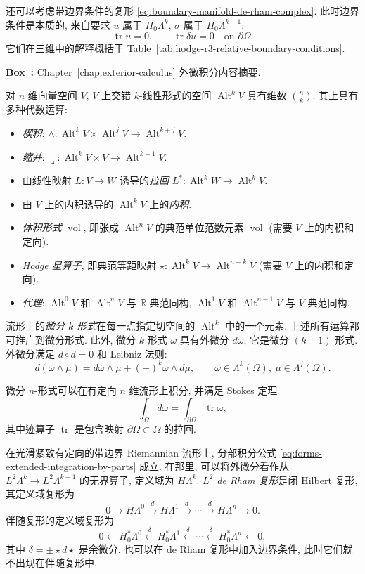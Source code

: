还可以考虑带边界条件的复形 \eqref{eq:boundary-manifold-de-rham-complex}. 此时边界条件是本质的, 来自要求 $u$ 属于 $ H_{0}\Lambda^k$, $\sigma$ 属于 $ H_{0}\Lambda^{k-1}$:
\[
\operatorname{tr}u=0,\qquad\operatorname{tr}\delta u=0\quad\text{on }\partial\Omega.
\]
它们在三维中的解释概括于 Table~\ref{tab:hodge-r3-relative-boundary-conditions}.
\newpage
\begin{MBSourceBox}
\label{box:exterior-calculus-summary}
\noindent\textbf{Box~\thebooksummary:} {Chapter~\ref{chap:exterior-calculus} 外微积分内容摘要.}\par

对 $n$ 维向量空间 $V$, $V$ 上交错 $k$-线性形式的空间 $\operatorname{Alt}^kV$ 具有维数 $\binom nk$. 其上具有多种代数运算:
\begin{itemize}
\item{\emph{楔积}: $\wedge:\operatorname{Alt}^kV\times\operatorname{Alt}^jV\to\operatorname{Alt}^{k+j}V$.}
\item{\emph{缩并}: $\lrcorner:\operatorname{Alt}^kV\times V\to\operatorname{Alt}^{k-1}V$.}
\item{由线性映射 $L:V\to W$ 诱导的\emph{拉回} $L^*:\operatorname{Alt}^kW\to\operatorname{Alt}^kV$.}
\item{由 $V$ 上的内积诱导的 $\operatorname{Alt}^kV$ 上的\emph{内积}.}
\item{\emph{体积形式} $\operatorname{vol}$, 即张成 $\operatorname{Alt}^nV$ 的典范单位范数元素 $\operatorname{vol}$ (需要 $V$ 上的内积和定向).}
\item{\emph{Hodge 星算子}, 即典范等距映射 $\star:\operatorname{Alt}^kV\to\operatorname{Alt}^{n-k}V$ (需要 $V$ 上的内积和定向).}
\item{\emph{代理}: $\operatorname{Alt}^0V$ 和 $\operatorname{Alt}^nV$ 与 $\mathbb R$ 典范同构, $\operatorname{Alt}^1V$ 和 $\operatorname{Alt}^{n-1}V$ 与 $V$ 典范同构.}
\end{itemize}

流形上的\emph{微分 $k$-形式}在每一点指定切空间的 $\operatorname{Alt}^k$ 中的一个元素. 上述所有运算都可推广到微分形式. 此外, 微分 $k$-形式 $\omega$ 具有外微分 $d\omega$, 它是微分 $(k+1)$-形式. 外微分满足 $d\circ d=0$ 和 Leibniz 法则:
\[
d(\omega\wedge\mu)=d\omega\wedge\mu+(-)^k\omega\wedge d\mu,\qquad\omega\in\Lambda^k(\Omega),\ \mu\in\Lambda^j(\Omega).
\]

微分 $n$-形式可以在有定向 $n$ 维流形上积分, 并满足 Stokes 定理
\[
\int_\Omega d\omega=\int_{\partial\Omega}\operatorname{tr}\omega,
\]
其中迹算子 $\operatorname{tr}$ 是包含映射 $\partial\Omega\subset\Omega$ 的拉回.

在光滑紧致有定向的带边界 Riemannian 流形上, 分部积分公式 \eqref{eq:forms-extended-integration-by-parts} 成立. 在那里, 可以将外微分看作从 $L^2\Lambda^k\to L^2\Lambda^{k+1}$ 的无界算子, 定义域为 $H\Lambda^k$. \emph{$L^2$ de Rham 复形}是闭 Hilbert 复形, 其定义域复形为
\[
0\to H\Lambda^0\xrightarrow{d}H\Lambda^1\xrightarrow{d}\cdots\xrightarrow{d}H\Lambda^n\to0.
\]
伴随复形的定义域复形为
\[
0\leftarrow H_{0}^*\Lambda^0\xleftarrow{\delta} H_{0}^*\Lambda^1\xleftarrow{\delta}\cdots\xleftarrow{\delta} H_{0}^*\Lambda^n\leftarrow0,
\]
其中 $\delta=\pm\star d\star$ 是余微分. 也可以在 de Rham 复形中加入边界条件, 此时它们就不出现在伴随复形中.
\end{MBSourceBox}
